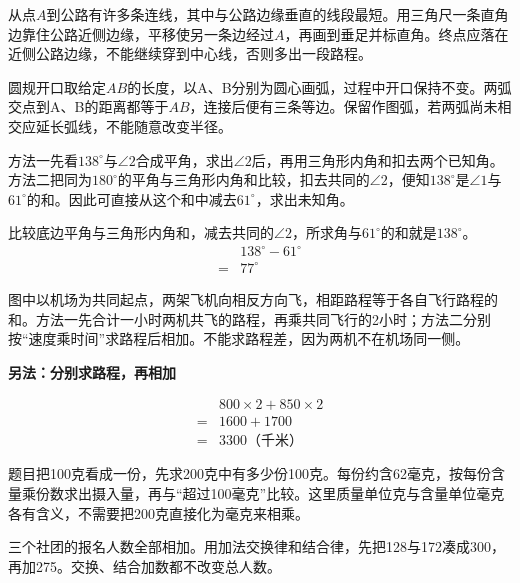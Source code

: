 \documentclass[multi=snippet,border=0pt]{standalone}
\newenvironment{snippet}[3]{\begin{minipage}{#1bp}\color{answerred}\fontsize{#2}{#3}\selectfont\raggedright}{\end{minipage}}
\begin{document}
\begin{snippet}{505}{11.5}{14}从点\(A\)到公路有许多条连线，其中与公路边缘垂直的线段最短。用三角尺一条直角边靠住公路近侧边缘，平移使另一条边经过\(A\)，再画到垂足并标直角。终点应落在近侧公路边缘，不能继续穿到中心线，否则多出一段路程。\end{snippet}
\begin{snippet}{505}{11.5}{14}圆规开口取给定\(AB\)的长度，以A、B分别为圆心画弧，过程中开口保持不变。两弧交点到A、B的距离都等于\(AB\)，连接后便有三条等边。保留作图弧，若两弧尚未相交应延长弧线，不能随意改变半径。\end{snippet}
\begin{snippet}{505}{11.5}{14}方法一先看\(138^\circ\)与\(\angle2\)合成平角，求出\(\angle2\)后，再用三角形内角和扣去两个已知角。方法二把同为\(180^\circ\)的平角与三角形内角和比较，扣去共同的\(\angle2\)，便知\(138^\circ\)是\(\angle1\)与\(61^\circ\)的和。因此可直接从这个和中减去\(61^\circ\)，求出未知角。\par 比较底边平角与三角形内角和，减去共同的\(\angle2\)，所求角与\(61^\circ\)的和就是\(138^\circ\)。\[\begin{aligned}&138^\circ-61^\circ\\={}&77^\circ\end{aligned}\]\end{snippet}
\begin{snippet}{505}{11.5}{14}图中以机场为共同起点，两架飞机向相反方向飞，相距路程等于各自飞行路程的和。方法一先合计一小时两机共飞的路程，再乘共同飞行的2小时；方法二分别按“速度乘时间”求路程后相加。不能求路程差，因为两机不在机场同一侧。\par \textbf{另法：分别求路程，再相加}\par \[\begin{aligned}&800\times2+850\times2\\={}&1600+1700\\={}&3300\text{（千米）}\end{aligned}\]\end{snippet}
\begin{snippet}{505}{11.5}{14}题目把100克看成一份，先求200克中有多少份100克。每份约含62毫克，按每份含量乘份数求出摄入量，再与“超过100毫克”比较。这里质量单位克与含量单位毫克各有含义，不需要把200克直接化为毫克来相乘。\end{snippet}
\begin{snippet}{505}{11.5}{14}三个社团的报名人数全部相加。用加法交换律和结合律，先把128与172凑成300，再加275。交换、结合加数都不改变总人数。\end{snippet}
\end{document}
